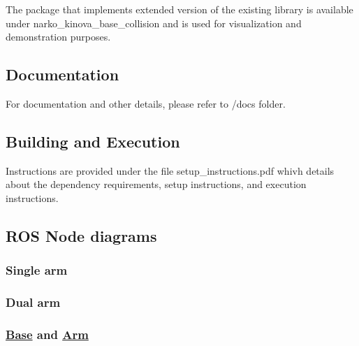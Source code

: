 The package that implements extended version of the existing library is available under narko\+\_\+kinova\+\_\+base\+\_\+collision and is used for visualization and demonstration purposes.

\subsection*{Documentation}

For documentation and other details, please refer to /docs folder.

\subsection*{Building and Execution}

Instructions are provided under the file setup\+\_\+instructions.\+pdf whivh details about the dependency requirements, setup instructions, and execution instructions.

\subsection*{R\+OS Node diagrams}

\subsubsection*{Single arm}

 

\subsubsection*{Dual arm}

  \subsubsection*{\hyperlink{class_base}{Base} and \hyperlink{class_arm}{Arm}}

  